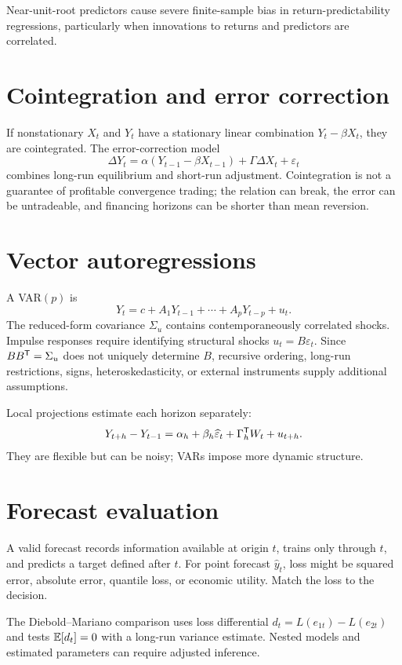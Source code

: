 Near-unit-root predictors cause severe finite-sample bias in return-predictability
regressions, particularly when innovations to returns and predictors are correlated.

\section{Cointegration and error correction}

If nonstationary $X_t$ and $Y_t$ have a stationary linear combination
$Y_t-\beta X_t$, they are cointegrated. The error-correction model
\[
\Delta Y_t=\alpha(Y_{t-1}-\beta X_{t-1})
+\Gamma\Delta X_t+\varepsilon_t
\]
combines long-run equilibrium and short-run adjustment. Cointegration is not a
guarantee of profitable convergence trading; the relation can break, the error can
be untradeable, and financing horizons can be shorter than mean reversion.

\section{Vector autoregressions}

A VAR$(p)$ is
\[
Y_t=c+A_1Y_{t-1}+\cdots+A_pY_{t-p}+u_t.
\]
The reduced-form covariance $\Sigma_u$ contains contemporaneously correlated shocks.
Impulse responses require identifying structural shocks
$u_t=B\varepsilon_t$. Since $BB^\mathsf T=\Sigma_u$ does not uniquely determine
$B$, recursive ordering, long-run restrictions, signs, heteroskedasticity, or
external instruments supply additional assumptions.

Local projections estimate each horizon separately:
\[
Y_{t+h}-Y_{t-1}=\alpha_h+\beta_h\widehat\varepsilon_t+
\Gamma_h^\mathsf T W_t+u_{t+h}.
\]
They are flexible but can be noisy; VARs impose more dynamic structure.

\section{Forecast evaluation}

A valid forecast records information available at origin $t$, trains only through
$t$, and predicts a target defined after $t$. For point forecast $\widehat y_t$, loss
might be squared error, absolute error, quantile loss, or economic utility. Match the
loss to the decision.

The Diebold--Mariano comparison uses loss differential
$d_t=L(e_{1t})-L(e_{2t})$ and tests $\operatorname{\mathbb E}[d_t]=0$ with a long-run variance estimate.
Nested models and estimated parameters can require adjusted inference.


